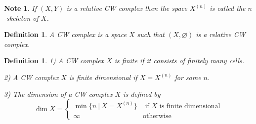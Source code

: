 \documentclass[11pt, letterpaper, oneside]{report}
\theoremstyle{pplain}
\theoremstyle{ddefinition}
\newtheorem{definition}[theorem]{Definition}
\newtheorem{note}[theorem]{Note}
\theoremstyle{nnn}
\theoremstyle{eexercise}
\begin{document}
\begin{note}
If $(X, Y)$ is a relative CW complex then the space $X^{(n)}$ is called \emph{the $n$-skeleton}
of $X$. 
\end{note}

\begin{definition}
A \emph{CW complex}  is a space $X$ such that $(X, \varnothing)$
is a relative CW complex.  
\end{definition}

\begin{definition}
1) A CW complex $X$ is \emph{finite} if it consists of finitely many cells. 

2) A CW complex $X$ is \emph{finite dimensional} if $X= X^{(n)}$ for some $n$. 

3) The \emph{dimension} of a CW complex $X$ is defined by 
$$
\dim X =
\begin{cases}
\min\{n \ | \  X = X^{(n)} \} & \text{ if $X$ is finite dimensional} \\
\infty  & \text{otherwise}
\end{cases}
$$
\end{definition}
\end{document}
